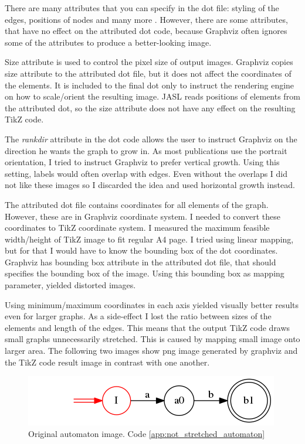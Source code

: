 \documentclass{ctuthesis}
\begin{document}
There are many attributes that you can specify in the dot file: styling of the edges, positions of nodes and many more \cite{dot-notation}. However, there are some attributes, that have no effect on the attributed dot code, because Graphviz often ignores some of the attributes to produce a better-looking image. 

Size attribute is used to control the pixel size of output images. Graphviz copies size attribute to the attributed dot file, but it does not affect the coordinates of the elements. It is included to the final dot only to instruct the rendering engine on how to scale/orient the resulting image. JASL reads positions of elements from the attributed dot, so the size attribute does not have any effect on the resulting TikZ code.

The \textit{rankdir} attribute in the dot code allows the user to instruct Graphviz on the direction he wants the graph to grow in. As most publications use the portrait orientation, I tried to instruct Graphviz to prefer vertical growth. Using this setting, labels would often overlap with edges. Even without the overlaps I did not like these images so I discarded the idea and used horizontal growth instead. 

The attributed dot file contains coordinates for all elements of the graph. However, these are in Graphviz coordinate system. I needed to convert these coordinates to TikZ coordinate system. I measured the maximum feasible width/height of TikZ image to fit regular A4 page. I tried using linear mapping, but for that I would have to know the bounding box of the dot coordinates. Graphviz has bounding box attribute in the attributed dot file, that should specifies the bounding box of the image. Using this bounding box as mapping parameter, yielded distorted images.  

Using minimum/maximum coordinates in each axis yielded visually better results even for larger graphs. As a side-effect I lost the ratio between sizes of the elements and length of the edges. This means that the output TikZ code draws small graphs unnecessarily stretched. This is caused by mapping small image onto larger area. The following two images show png image generated by graphviz and the TikZ code result image in contrast with one another. 

\begin{figure}[H]
\includegraphics[width=0.5\linewidth]{figures/not_stretched.png}
\caption{Original automaton image. Code \ref{app:not_stretched_automaton}}
\label{fig:not_stretched_automaton}
\end{figure}
\end{document}

